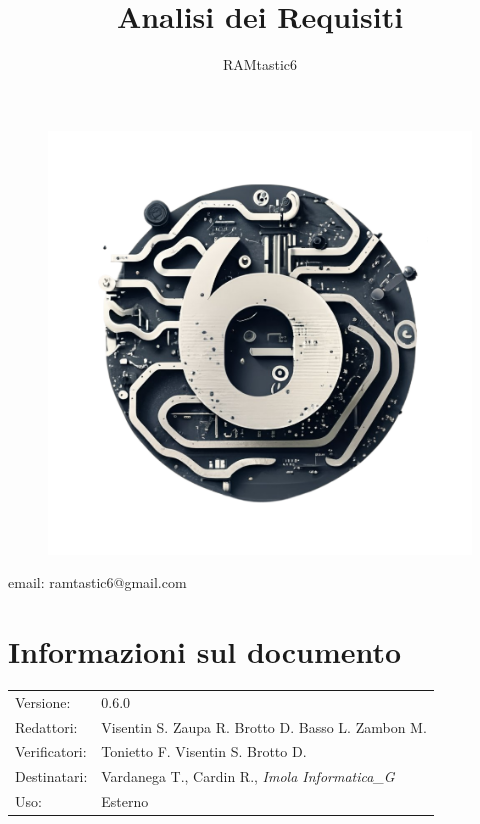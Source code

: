 \documentclass[12pt, oneside]{article}
\author{RAMtastic6}
\begin{document}
\thispagestyle{empty}
\title{Analisi dei Requisiti}
\maketitle
\begin{figure}[h]
  \centering
  \includegraphics[scale=0.3]{logo.png}
\end{figure}
\begin{center}
    email: ramtastic6@gmail.com
\end{center}

\section*{Informazioni sul documento} 
\begin{tabular}{ll}
Versione: & 0.6.0 \\
Redattori: &  Visentin S.  Zaupa R. Brotto D. Basso L. Zambon M. \\ 
Verificatori: & Tonietto F. Visentin S. Brotto D. \\
Destinatari: & Vardanega T., Cardin R., \textit{Imola Informatica_G} \\
Uso: & Esterno
\end{tabular}
\newpage
\end{document}
